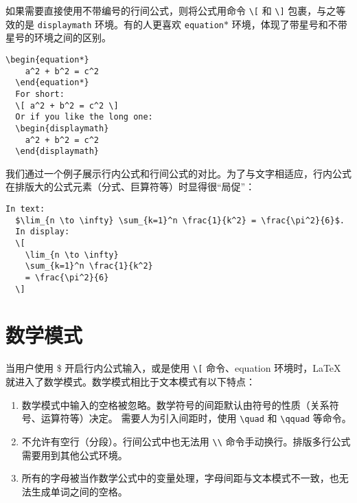 如果需要直接使用不带编号的行间公式，则将公式用命令 \verb|\[| 和 \verb|\]| 包裹，与之等效的是 \verb|displaymath| 环境。有的人更喜欢 \verb|equation|$*$ 环境，体现了带星号和不带星号的环境之间的区别。

\begin{lstlisting}[caption=多行公式示例三]
  \begin{equation*}
    a^2 + b^2 = c^2
  \end{equation*}
  For short:
  \[ a^2 + b^2 = c^2 \]
  Or if you like the long one:
  \begin{displaymath}
    a^2 + b^2 = c^2
  \end{displaymath}
\end{lstlisting}
\clearpage
\begin{center}
\end{center}

我们通过一个例子展示行内公式和行间公式的对比。为了与文字相适应，行内公式在排版大的公式元素（分式、巨算符等）时显得很“局促”：
\begin{lstlisting}[caption=综合示例]
  In text:
  $\lim_{n \to \infty} \sum_{k=1}^n \frac{1}{k^2} = \frac{\pi^2}{6}$.
  In display:
  \[
    \lim_{n \to \infty}
    \sum_{k=1}^n \frac{1}{k^2}
    = \frac{\pi^2}{6}
  \]
\end{lstlisting}
\begin{center}
\end{center}
\clearpage
\section{数学模式}
当用户使用 \$ 开启行内公式输入，或是使用 \verb|\[| 命令、equation 环境时，\LaTeX{} 就进入了数学模式。数学模式相比于文本模式有以下特点：
\begin{enumerate}
	\item 数学模式中输入的空格被忽略。数学符号的间距默认由符号的性质（关系符号、运算符等）决定。
	需要人为引入间距时，使用 \verb|\quad| 和 \verb|\qquad| 等命令。
	\item 不允许有空行（分段）。行间公式中也无法用 \verb|\\| 命令手动换行。排版多行公式需要用到其他公式环境。
	\item 所有的字母被当作数学公式中的变量处理，字母间距与文本模式不一致，也无法生成单词之间的空格。
\end{enumerate}
